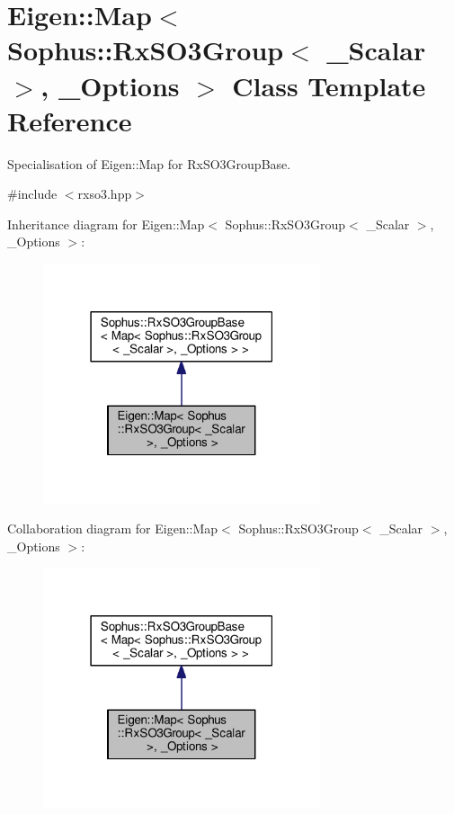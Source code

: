 \hypertarget{class_eigen_1_1_map_3_01_sophus_1_1_rx_s_o3_group_3_01___scalar_01_4_00_01___options_01_4}{}\section{Eigen\+:\+:Map$<$ Sophus\+:\+:Rx\+S\+O3\+Group$<$ \+\_\+\+Scalar $>$, \+\_\+\+Options $>$ Class Template Reference}
\label{class_eigen_1_1_map_3_01_sophus_1_1_rx_s_o3_group_3_01___scalar_01_4_00_01___options_01_4}


Specialisation of Eigen\+::\+Map for Rx\+S\+O3\+Group\+Base.  




{\ttfamily \#include $<$rxso3.\+hpp$>$}



Inheritance diagram for Eigen\+:\+:Map$<$ Sophus\+:\+:Rx\+S\+O3\+Group$<$ \+\_\+\+Scalar $>$, \+\_\+\+Options $>$\+:
\nopagebreak
\begin{figure}[H]
\begin{center}
\leavevmode
\includegraphics[width=231pt]{class_eigen_1_1_map_3_01_sophus_1_1_rx_s_o3_group_3_01___scalar_01_4_00_01___options_01_4__inherit__graph}
\end{center}
\end{figure}


Collaboration diagram for Eigen\+:\+:Map$<$ Sophus\+:\+:Rx\+S\+O3\+Group$<$ \+\_\+\+Scalar $>$, \+\_\+\+Options $>$\+:
\nopagebreak
\begin{figure}[H]
\begin{center}
\leavevmode
\includegraphics[width=231pt]{class_eigen_1_1_map_3_01_sophus_1_1_rx_s_o3_group_3_01___scalar_01_4_00_01___options_01_4__coll__graph}
\end{center}
\end{figure}
